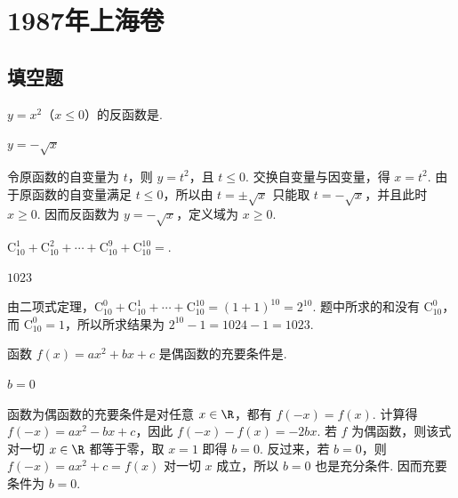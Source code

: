 \chapter{1987年上海卷}

\section{填空题}

\begin{problem}
\(y=x^2\)（\(x\leqslant 0\)）的反函数是\fillinblank{}.
\end{problem}

\begin{answer}
\(y=-\sqrt{x}\)
\end{answer}

\begin{solution}
令原函数的自变量为 \(t\)，则 \(y=t^2\)，且 \(t\leqslant0\). 交换自变量与因变量，得 \(x=t^2\). 由于原函数的自变量满足 \(t\leqslant0\)，所以由 \(t=\pm\sqrt{x}\) 只能取 \(t=-\sqrt{x}\)，并且此时 \(x\geqslant0\). 因而反函数为 \(y=-\sqrt{x}\)，定义域为 \(x\geqslant0\).
\end{solution}

\begin{problem}
\(\mathrm C_{10}^1+\mathrm C_{10}^2+\cdots+\mathrm C_{10}^9+\mathrm C_{10}^{10}=\)\fillinblank{}.
\end{problem}

\begin{answer}
\(1023\)
\end{answer}

\begin{solution}
由二项式定理，\(\mathrm C_{10}^0+\mathrm C_{10}^1+\cdots+\mathrm C_{10}^{10}=(1+1)^{10}=2^{10}\). 题中所求的和没有 \(\mathrm C_{10}^0\)，而 \(\mathrm C_{10}^0=1\)，所以所求结果为 \(2^{10}-1=1024-1=1023\).
\end{solution}

\begin{problem}
函数 \(f(x)=ax^2+bx+c\) 是偶函数的充要条件是\fillinblank{}.
\end{problem}

\begin{answer}
\(b=0\)
\end{answer}

\begin{solution}
函数为偶函数的充要条件是对任意 \(x\in\R\)，都有 \(f(-x)=f(x)\). 计算得 \(f(-x)=ax^2-bx+c\)，因此
\(f(-x)-f(x)=-2bx\). 若 \(f\) 为偶函数，则该式对一切 \(x\in\R\) 都等于零，取 \(x=1\) 即得 \(b=0\). 反过来，若 \(b=0\)，则 \(f(-x)=ax^2+c=f(x)\) 对一切 \(x\) 成立，所以 \(b=0\) 也是充分条件. 因而充要条件为 \(b=0\).
\end{solution}

